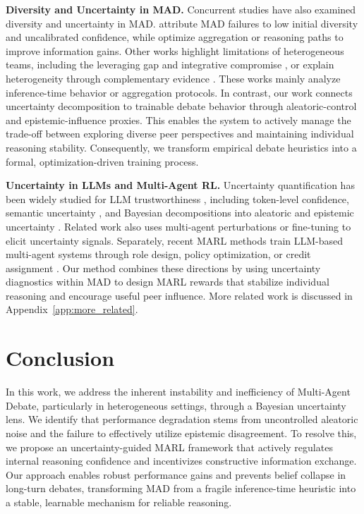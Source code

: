 \documentclass{article}
\theoremstyle{plain}
\theoremstyle{definition}
\theoremstyle{remark}
\begin{document}
\textbf{Diversity and Uncertainty in MAD.}
Concurrent studies have also examined diversity and uncertainty in MAD. \citet{zhu2026demystifying} attribute MAD failures to low initial diversity and uncalibrated confidence, while \citet{ai2025beyond,li2026dynadebate} optimize aggregation or reasoning paths to improve information gains. Other works highlight limitations of heterogeneous teams, including the leveraging gap and integrative compromise \cite{li2026m3mad,pappu2026multi}, or explain heterogeneity through complementary evidence \cite{yang2026understanding}. These works mainly analyze inference-time behavior or aggregation protocols. In contrast, our work connects uncertainty decomposition to trainable debate behavior through aleatoric-control and epistemic-influence proxies. This enables the system to actively manage the trade-off between exploring diverse peer perspectives and maintaining individual reasoning stability. Consequently, we transform empirical debate heuristics into a formal, optimization-driven training process.

\textbf{Uncertainty in LLMs and Multi-Agent RL.}
Uncertainty quantification has been widely studied for LLM trustworthiness \cite{huang2025look}, including token-level confidence, semantic uncertainty \cite{kuhnsemantic, wang2025measuring}, and Bayesian decompositions into aleatoric and epistemic uncertainty \cite{liu2025uncertainty, huang2024survey, geng2024confidencesurvey, abbasi2024believe, jayasekera2025variational, ling2024uncertainty}. Related work also uses multi-agent perturbations \cite{amayuelas2024knowledge} or fine-tuning \cite{feng2025rethinking} to elicit uncertainty signals. Separately, recent MARL methods train LLM-based multi-agent systems through role design, policy optimization, or credit assignment \cite{park2025maporl,liao2025marft,liu2025llm,zhao2025stronger}. Our method combines these directions by using uncertainty diagnostics within MAD to design MARL rewards that stabilize individual reasoning and encourage useful peer influence. More related work is discussed in Appendix~\ref{app:more_related}.







\section{Conclusion}
In this work, we address the inherent instability and inefficiency of Multi-Agent Debate, particularly in heterogeneous settings, through a Bayesian uncertainty lens. We identify that performance degradation stems from uncontrolled aleatoric noise and the failure to effectively utilize epistemic disagreement. To resolve this, we propose an uncertainty-guided MARL framework that actively regulates internal reasoning confidence and incentivizes constructive information exchange. Our approach enables robust performance gains and prevents belief collapse in long-turn debates, transforming MAD from a fragile inference-time heuristic into a stable, learnable mechanism for reliable reasoning.
\end{document}
